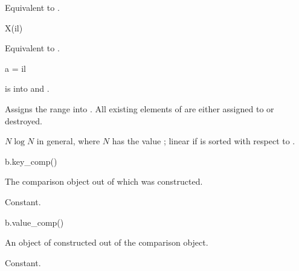 \begin{itemdescr}
\pnum
\effects
Equivalent to .
\end{itemdescr}

%
%
%
%
\begin{itemdecl}
X(il)
\end{itemdecl}

\begin{itemdescr}
\pnum
\effects
Equivalent to .
\end{itemdescr}

\begin{itemdecl}
a = il
\end{itemdecl}

\begin{itemdescr}
\pnum
\result
{}

\pnum
\expects
{} is  into 
and .

\pnum
\effects
Assigns the range  into .
All existing elements of  are either assigned to or destroyed.

\pnum
\complexity
$N \log N$ in general, where $N$ has the value ;
linear if  is sorted with respect to .
\end{itemdescr}

%
\begin{itemdecl}
b.key_comp()
\end{itemdecl}

\begin{itemdescr}
\pnum
\result
{}

\pnum
\returns
The comparison object out of which  was constructed.

\pnum
\complexity
Constant.
\end{itemdescr}

%
\begin{itemdecl}
b.value_comp()
\end{itemdecl}

\begin{itemdescr}
\pnum
\result
{}

\pnum
\returns
An object of  constructed out of the comparison object.

\pnum
\complexity
Constant.
\end{itemdescr}

